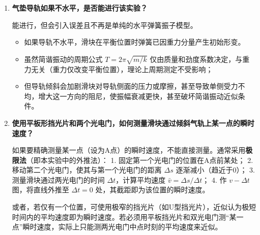 \documentclass[11pt]{article}
\begin{document}
\begin{enumerate}
    光电门最好放置在平衡位置上。
    
    原因：
    \begin{itemize}
        \item 在平衡位置，滑块速度最大，通过光电门的时间最短，位置界定最准确，测量的计时误差最小。
        \item 在平衡位置，滑块所受合外力为零，运动状态相对稳定。
    \end{itemize}
    若不在平衡位置：
    \begin{itemize}
        \item 虽然从理论上讲，只要经过同一位置两次同向通过的时间间隔仍是一个周期，周期测量值应当不变；
        \item 但在非平衡位置，滑块速度较慢，挡光时间变长，且容易受到阻尼引起的振幅衰减影响，导致“同一位置”的相位点发生微小偏移，增加测量误差。特别是如果光电门放置在接近振幅端点处，滑块速度极慢甚至可能无法完成完整的挡光触发，导致无法测量。
    \end{itemize}

    \item \textbf{气垫导轨如果不水平，是否能进行该实验？}
    
    能进行，但会引入误差且不再是单纯的水平弹簧振子模型。
    \begin{itemize}
        \item 如果导轨不水平，滑块在平衡位置时弹簧已因重力分量产生初始形变。
        \item 虽然简谐振动的周期公式 $T=2\pi\sqrt{m/k}$ 仅由质量和劲度系数决定，与重力无关（重力仅改变平衡位置），理论上周期测定不受影响；
        \item 但导轨倾斜会加剧滑块对导轨侧面的压力或摩擦，甚至导致单侧受力不均，增大这一方向的阻尼，使振幅衰减更快，甚至破坏简谐振动近似条件。
    \end{itemize}

    \item \textbf{使用平板形挡光片和两个光电门，如何测量滑块通过倾斜气轨上某一点的瞬时速度？}
    
    如果要精确测量某一点（设为A点）的瞬时速度，不能直接测量。通常采用\textbf{极限法}（即本实验中的外推法）：
    1. 固定第一个光电门的位置在A点前某处；
    2. 移动第二个光电门，使其与第一个光电门的距离 $\Delta s$ 逐渐减小（趋近于0）；
    3. 测量滑块通过两光电门的时间 $\Delta t$，计算平均速度 $\bar{v} = \Delta s / \Delta t$；
    4. 作 $v - \Delta t$ 图，将直线外推至 $\Delta t = 0$ 处，其截距即为该位置的瞬时速度。
    
    或者，若仅有一个位置，可使用极窄的挡光片（如U型挡光片），近似认为极短时间内的平均速度即为瞬时速度。若必须用平板挡光片和双光电门测“某一点”瞬时速度，实际上只能测两光电门中点时刻的平均速度来近似。


\end{enumerate}
\end{document}
